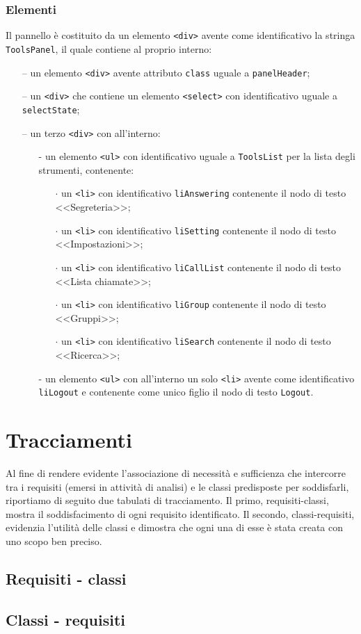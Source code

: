 \subsubsection*{Elementi}
Il pannello è costituito da un elemento \verb'<div>' avente come identificativo la stringa \verb'ToolsPanel', il quale contiene al proprio interno:
\begin{itemize}
  \item[--] un elemento \verb'<div>' avente attributo \verb'class' uguale a \verb'panelHeader';
  \item[--] un \verb'<div>' che contiene un elemento \verb'<select>' con identificativo uguale a \verb'selectState';
  \item[--] un terzo \verb'<div>' con all'interno:
  \begin{itemize}
    \item[-] un elemento \verb'<ul>' con identificativo uguale a \verb'ToolsList' per la lista degli strumenti, contenente:
      \begin{itemize}
        \item[$\cdot$] un \verb'<li>' con identificativo \verb'liAnswering' contenente il nodo di testo <<Segreteria>>;
        \item[$\cdot$] un \verb'<li>' con identificativo \verb'liSetting' contenente il nodo di testo <<Impostazioni>>;
        \item[$\cdot$] un \verb'<li>' con identificativo \verb'liCallList' contenente il nodo di testo  <<Lista chiamate>>;
        \item[$\cdot$] un \verb'<li>' con identificativo \verb'liGroup' contenente il nodo di testo <<Gruppi>>;
        \item[$\cdot$] un \verb'<li>' con identificativo \verb'liSearch' contenente il nodo di testo <<Ricerca>>;
      \end{itemize}
    \item[-] un elemento \verb'<ul>' con all'interno un solo \verb'<li>' avente come identificativo \verb'liLogout' e contenente come unico figlio il nodo di testo \verb'Logout'.
  \end{itemize}
\end{itemize}


\clearpage

\section{Tracciamenti}

Al fine di rendere evidente l'associazione di necessità e sufficienza che intercorre tra i requisiti (emersi in attività di analisi) e le classi predisposte per soddisfarli, riportiamo di seguito due tabulati di tracciamento. Il primo, requisiti-classi, mostra il soddisfacimento di ogni requisito identificato. Il secondo, classi-requisiti, evidenzia l'utilità delle classi e dimostra che ogni una di esse è stata creata con uno scopo ben preciso.

\subsection{Requisiti - classi}

\subsection{Classi - requisiti}


